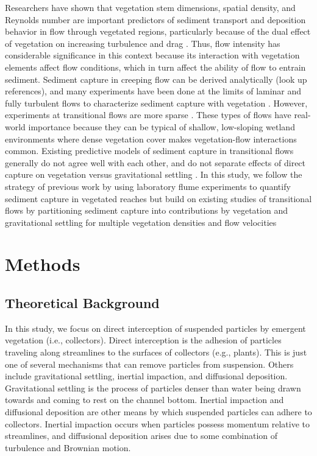 \documentclass{scrreprt}
\begin{document}
Researchers have shown that vegetation stem dimensions, spatial density, and Reynolds number are important predictors of sediment transport and deposition behavior in flow through vegetated regions, particularly because of the dual effect of vegetation on increasing turbulence and drag \citep{Fauria_2015, nepf_drag_1999, Palmer_2004}. Thus, flow intensity has considerable significance in this context because its interaction with vegetation elements affect flow conditions, which in turn affect the ability of flow to entrain sediment. Sediment capture in creeping flow can be derived analytically (look up references), and many experiments have been done at the limits of laminar and fully turbulent flows to characterize sediment capture with vegetation \citep{Shan_turbulence_2020, Wu_2011, Yang_2016}. However, experiments at transitional flows are more sparse \citep{Fauria_2015, Palmer_2004, Purich_2007}. These types of flows have real-world importance because they can be typical of shallow, low-sloping wetland environments where dense vegetation cover makes vegetation-flow interactions common. Existing predictive models of sediment capture in transitional flows generally do not agree well with each other, and do not separate effects of direct capture on vegetation versus gravitational settling \citep{Fauria_2015, Palmer_2004}. In this study, we follow the strategy of previous work by using laboratory flume experiments to quantify sediment capture in vegetated reaches but build on existing studies of transitional flows by partitioning sediment capture into contributions by vegetation and gravitational settling for multiple vegetation densities and flow velocities 


\chapter{Methods}

\section{Theoretical Background}

In this study, we focus on direct interception of suspended particles by emergent vegetation (i.e., collectors). Direct interception is the adhesion of particles traveling along streamlines to the surfaces of collectors (e.g., plants). This is just one of several mechanisms that can remove particles from suspension. Others include gravitational settling, inertial impaction, and diffusional deposition. Gravitational settling is the process of particles denser than water being drawn towards and coming to rest on the channel bottom. Inertial impaction and diffusional deposition are other means by which suspended particles can adhere to collectors. Inertial impaction occurs when particles possess momentum relative to streamlines, and diffusional deposition arises due to some combination of turbulence and Brownian motion.
\end{document}
